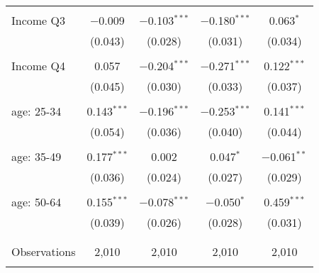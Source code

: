 \begin{tabular}{@{\extracolsep{5pt}}lcccc}
  & & & & \\ 
 Income Q3 & $-$0.009 & $-$0.103$^{***}$ & $-$0.180$^{***}$ & 0.063$^{*}$ \\ 
  & (0.043) & (0.028) & (0.031) & (0.034) \\ 
  & & & & \\ 
 Income Q4 & 0.057 & $-$0.204$^{***}$ & $-$0.271$^{***}$ & 0.122$^{***}$ \\ 
  & (0.045) & (0.030) & (0.033) & (0.037) \\ 
  & & & & \\ 
 age: 25-34 & 0.143$^{***}$ & $-$0.196$^{***}$ & $-$0.253$^{***}$ & 0.141$^{***}$ \\ 
  & (0.054) & (0.036) & (0.040) & (0.044) \\ 
  & & & & \\ 
 age: 35-49 & 0.177$^{***}$ & 0.002 & 0.047$^{*}$ & $-$0.061$^{**}$ \\ 
  & (0.036) & (0.024) & (0.027) & (0.029) \\ 
  & & & & \\ 
 age: 50-64 & 0.155$^{***}$ & $-$0.078$^{***}$ & $-$0.050$^{*}$ & 0.459$^{***}$ \\ 
  & (0.039) & (0.026) & (0.028) & (0.031) \\ 
  & & & & \\ 
\hline \\[-1.8ex] 

Observations & 2,010 & 2,010 & 2,010 & 2,010 \\ 
\hline 
\hline \\[-1.8ex] 
\end{tabular} 